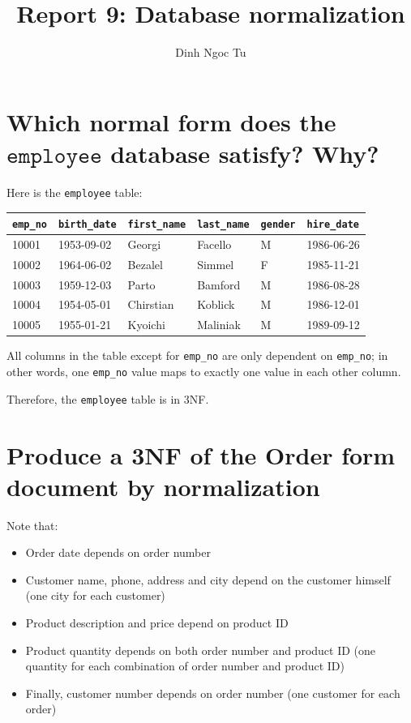 \documentclass[12pt]{article}
\title{Report 9: Database normalization}
\author{Dinh Ngoc Tu}
\begin{document}
\maketitle


\section{Which normal form does the $\texttt{employee}$ database satisfy? Why?}

Here is the \verb|employee| table:

\begin{tabular}{l|l|l|l|l|l}
	\verb|emp_no| & \verb|birth_date| & \verb|first_name| & \verb|last_name| & \verb|gender| & \verb|hire_date| \\
	\hline
	10001 & 1953-09-02 & Georgi & Facello & M & 1986-06-26 \\
	10002 & 1964-06-02 & Bezalel & Simmel & F & 1985-11-21 \\
	10003 & 1959-12-03 & Parto & Bamford & M & 1986-08-28 \\
	10004 & 1954-05-01 & Chirstian & Koblick & M & 1986-12-01 \\
	10005 & 1955-01-21 & Kyoichi & Maliniak & M & 1989-09-12 \\
\end{tabular}

All columns in the table except for \verb|emp_no| are only dependent on \verb|emp_no|; in other words, one \verb|emp_no| value maps to exactly one value in each other column.

Therefore, the \verb|employee| table is in 3NF.


\section{Produce a 3NF of the Order form document by normalization}

Note that:
\begin{itemize}
	\item Order date depends on order number
	\item Customer name, phone, address and city depend on the customer himself (one city for each customer)
	\item Product description and price depend on product ID
	\item Product quantity depends on both order number and product ID (one quantity for each combination of order number and product ID)
	\item Finally, customer number depends on order number (one customer for each order)
\end{itemize}
\end{document}
